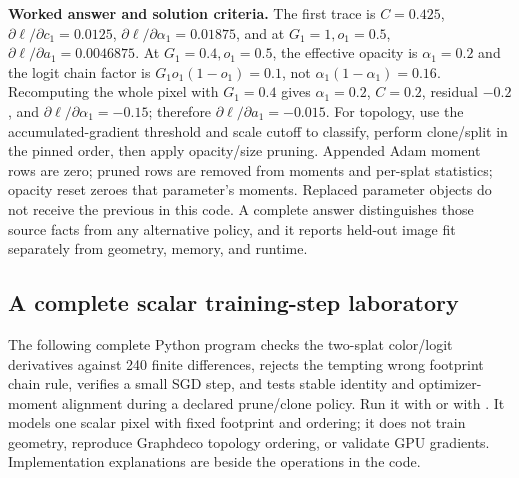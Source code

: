 \textbf{Worked answer and solution criteria.} The first trace is \(C=0.425\), \(\partial\ell/\partial c_1=0.0125\), \(\partial\ell/\partial\alpha_1=0.01875\), and at \(G_1=1,o_1=0.5\), \(\partial\ell/\partial a_1=0.0046875\). At \(G_1=0.4,o_1=0.5\), the effective opacity is \(\alpha_1=0.2\) and the logit chain factor is \(G_1o_1(1-o_1)=0.1\), not \(\alpha_1(1-\alpha_1)=0.16\). Recomputing the whole pixel with \(G_1=0.4\) gives \(\alpha_1=0.2\), \(C=0.2\), residual \(-0.2\), and \(\partial\ell/\partial\alpha_1=-0.15\); therefore \(\partial\ell/\partial a_1=-0.015\). For topology, use the accumulated-gradient threshold and scale cutoff to classify, perform clone/split in the pinned order, then apply opacity/size pruning. Appended Adam moment rows are zero; pruned rows are removed from moments and per-splat statistics; opacity reset zeroes that parameter's moments. Replaced parameter objects do not receive the previous  in this code. A complete answer distinguishes those source facts from any alternative policy, and it reports held-out image fit separately from geometry, memory, and runtime.

\subsection{A complete scalar training-step laboratory}\label{04-visual-computing-ii-ch039-a-complete-scalar-training-step-laboratory}

\hypertarget{04-visual-computing-ii-ch039-a-complete-scalar-training-step-laboratory}{}

The following complete Python program checks the two-splat color/logit derivatives against 240 finite differences, rejects the tempting wrong footprint chain rule, verifies a small SGD step, and tests stable identity and optimizer-moment alignment during a declared prune/clone policy. Run it with  or with . It models one scalar pixel with fixed footprint and ordering; it does not train geometry, reproduce Graphdeco topology ordering, or validate GPU gradients. Implementation explanations are beside the operations in the code.

